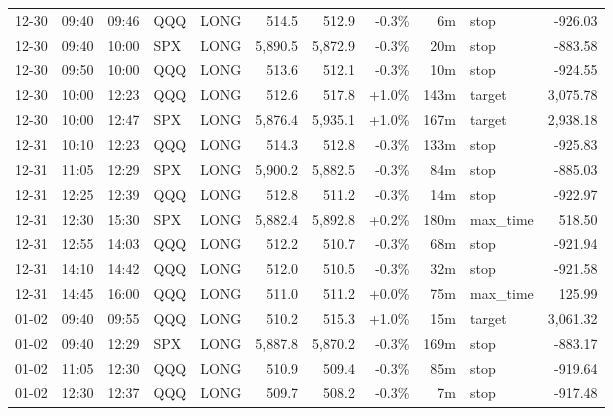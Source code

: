 \documentclass[11pt,a4paper,twoside]{article}
\begin{document}
\begin{center}
\begin{longtable}{>{\color{txtmain}}l l l l l r r r r >{\color{txtmain}}l r}
12-30 & 09:40 & 09:46 & QQQ & LONG & 514.5 & 512.9 & \textcolor{lossred}{-0.3\%} & 6m & stop & \textcolor{lossred}{-926.03} \\
12-30 & 09:40 & 10:00 & SPX & LONG & 5,890.5 & 5,872.9 & \textcolor{lossred}{-0.3\%} & 20m & stop & \textcolor{lossred}{-883.58} \\
12-30 & 09:50 & 10:00 & QQQ & LONG & 513.6 & 512.1 & \textcolor{lossred}{-0.3\%} & 10m & stop & \textcolor{lossred}{-924.55} \\
12-30 & 10:00 & 12:23 & QQQ & LONG & 512.6 & 517.8 & \textcolor{wingreen}{+1.0\%} & 143m & target & \textcolor{wingreen}{3,075.78} \\
12-30 & 10:00 & 12:47 & SPX & LONG & 5,876.4 & 5,935.1 & \textcolor{wingreen}{+1.0\%} & 167m & target & \textcolor{wingreen}{2,938.18} \\
12-31 & 10:10 & 12:23 & QQQ & LONG & 514.3 & 512.8 & \textcolor{lossred}{-0.3\%} & 133m & stop & \textcolor{lossred}{-925.83} \\
12-31 & 11:05 & 12:29 & SPX & LONG & 5,900.2 & 5,882.5 & \textcolor{lossred}{-0.3\%} & 84m & stop & \textcolor{lossred}{-885.03} \\
12-31 & 12:25 & 12:39 & QQQ & LONG & 512.8 & 511.2 & \textcolor{lossred}{-0.3\%} & 14m & stop & \textcolor{lossred}{-922.97} \\
12-31 & 12:30 & 15:30 & SPX & LONG & 5,882.4 & 5,892.8 & \textcolor{wingreen}{+0.2\%} & 180m & max\_time & \textcolor{wingreen}{518.50} \\
12-31 & 12:55 & 14:03 & QQQ & LONG & 512.2 & 510.7 & \textcolor{lossred}{-0.3\%} & 68m & stop & \textcolor{lossred}{-921.94} \\
12-31 & 14:10 & 14:42 & QQQ & LONG & 512.0 & 510.5 & \textcolor{lossred}{-0.3\%} & 32m & stop & \textcolor{lossred}{-921.58} \\
12-31 & 14:45 & 16:00 & QQQ & LONG & 511.0 & 511.2 & \textcolor{wingreen}{+0.0\%} & 75m & max\_time & \textcolor{wingreen}{125.99} \\
01-02 & 09:40 & 09:55 & QQQ & LONG & 510.2 & 515.3 & \textcolor{wingreen}{+1.0\%} & 15m & target & \textcolor{wingreen}{3,061.32} \\
01-02 & 09:40 & 12:29 & SPX & LONG & 5,887.8 & 5,870.2 & \textcolor{lossred}{-0.3\%} & 169m & stop & \textcolor{lossred}{-883.17} \\
01-02 & 11:05 & 12:30 & QQQ & LONG & 510.9 & 509.4 & \textcolor{lossred}{-0.3\%} & 85m & stop & \textcolor{lossred}{-919.64} \\
01-02 & 12:30 & 12:37 & QQQ & LONG & 509.7 & 508.2 & \textcolor{lossred}{-0.3\%} & 7m & stop & \textcolor{lossred}{-917.48} \\

\end{longtable}
\end{center}
\end{document}
